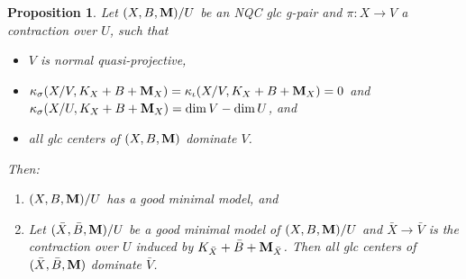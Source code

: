 \documentclass[11pt]{amsart}
\numberwithin{equation}{section}
\newcommand{\Mm}{{\bf{M}}}
\newtheorem{prop}[thm]{Proposition}
\theoremstyle{definition}
\theoremstyle{definition}
\theoremstyle{definition}
\begin{document}
\begin{prop}\label{prop: prop 3.4 has19 abu ver}
Let $(X,B,\Mm)/U$ be an NQC glc g-pair and $\pi: X\rightarrow V$ a contraction over $U$, such that
\begin{itemize}
    \item $V$ is normal quasi-projective,
    \item $\kappa_{\sigma}(X/V,K_X+B+\Mm_X)=\kappa_{\iota}(X/V,K_X+B+\Mm_X)=0$ and $\kappa_{\sigma}(X/U,K_X+B+\Mm_X)=\dim V-\dim U$, and 
    \item all glc centers of $(X,B,\Mm)$ dominate $V$.
\end{itemize}
Then:
\begin{enumerate}
    \item $(X,B,\Mm)/U$ has a good minimal model, and
    \item Let $(\bar X,\bar B,\Mm)/U$ be a good minimal model of $(X,B,\Mm)/U$ and $\bar X\rightarrow\bar V$ is the contraction over $U$ induced by $K_{\bar X}+\bar B+\Mm_{\bar X}$. Then all glc centers of $(\bar X,\bar B,\Mm)$ dominate $\bar V$.
\end{enumerate}
\end{prop}
\end{document}
